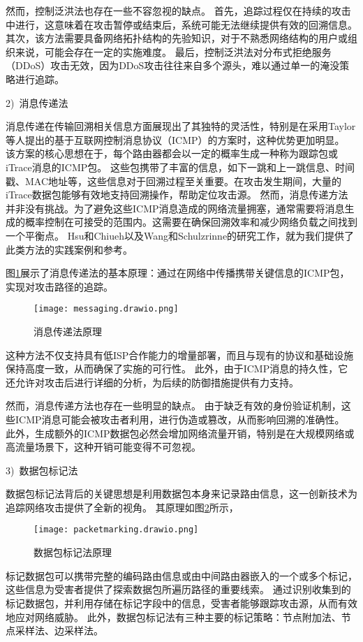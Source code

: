 然而，控制泛洪法也存在一些不容忽视的缺点。
首先，追踪过程仅在持续的攻击中进行，这意味着在攻击暂停或结束后，系统可能无法继续提供有效的回溯信息。
其次，该方法需要具备网络拓扑结构的先验知识，对于不熟悉网络结构的用户或组织来说，可能会存在一定的实施难度。
最后，控制泛洪法对分布式拒绝服务（DDoS）攻击无效，因为DDoS攻击往往来自多个源头，难以通过单一的淹没策略进行追踪。

2)~消息传递法\par
消息传递在传输回溯相关信息方面展现出了其独特的灵活性，特别是在采用Taylor等人提出的基于互联网控制消息协议（ICMP）的方案时，这种优势更加明显\cite{sikos2020packet}。
该方案的核心思想在于，每个路由器都会以一定的概率生成一种称为跟踪包或iTrace消息的ICMP包。
这些包携带了丰富的信息，如下一跳和上一跳信息、时间戳、MAC地址等，这些信息对于回溯过程至关重要。在攻击发生期间，大量的iTrace数据包能够有效地支持回溯操作，帮助定位攻击源。
然而，消息传递方法并非没有挑战。为了避免这些ICMP消息造成的网络流量拥塞，通常需要将消息生成的概率控制在可接受的范围内。这需要在确保回溯效率和减少网络负载之间找到一个平衡点。
Hsu和Chiueh\cite{Hsu2003TrafficSourceIdentification}以及Wang和Schulzrinne\cite{WangSchulzrinne2004DoS,WangSchulzrinne2004ReflectiveDoS}的研究工作，就为我们提供了此类方法的实践案例和参考。

图\ref{fig:messaging}展示了消息传递法的基本原理：通过在网络中传播携带关键信息的ICMP包，实现对攻击路径的追踪。
\begin{figure}[h]
  \centering
  \texttt{[image: messaging.drawio.png]}
  \caption{消息传递法原理}
  \label{fig:messaging}
\end{figure}
这种方法不仅支持具有低ISP合作能力的增量部署，而且与现有的协议和基础设施保持高度一致，从而确保了实施的可行性。
此外，由于ICMP消息的持久性，它还允许对攻击后进行详细的分析，为后续的防御措施提供有力支持。

然而，消息传递方法也存在一些明显的缺点。
由于缺乏有效的身份验证机制，这些ICMP消息可能会被攻击者利用，进行伪造或篡改，从而影响回溯的准确性。
此外，生成额外的ICMP数据包必然会增加网络流量开销，特别是在大规模网络或高流量场景下，这种开销可能变得不可忽视。


3)~数据包标记法\par
数据包标记法背后的关键思想是利用数据包本身来记录路由信息，这一创新技术为追踪网络攻击提供了全新的视角。
其原理如图\ref{fig:packet_marking}所示，
\begin{figure}[h]
  \centering
  \texttt{[image: packetmarking.drawio.png]}
  \caption{数据包标记法原理}
  \label{fig:packet_marking}
\end{figure}
标记数据包可以携带完整的编码路由信息或由中间路由器嵌入的一个或多个标记，这些信息为受害者提供了探索数据包所遍历路径的重要线索。
通过识别收集到的标记数据包，并利用存储在标记字段中的信息，受害者能够跟踪攻击源，从而有效地应对网络威胁。
此外，数据包标记法有三种主要的标记策略：节点附加法、节点采样法、边采样法\cite{fazio2020packet}。

